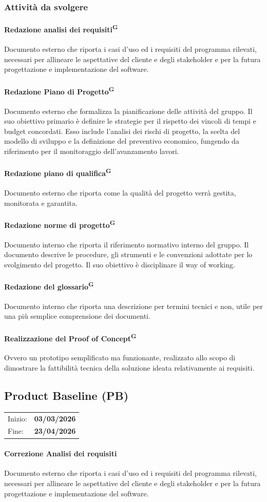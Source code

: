 \documentclass[a4paper, 11pt]{article}
\newcommand{\subsubsubsection}[1]{\paragraph{#1}}
\begin{document}
\subsubsection{Attività da svolgere}
\subsubsubsection{Redazione analisi dei requisiti\textsuperscript{G}}
Documento esterno che riporta i casi d'uso ed i requisiti del programma rilevati, necessari per allineare le aspettative del cliente e degli stakeholder e per la futura progettazione e implementazione del software.
\subsubsubsection{Redazione Piano di Progetto\textsuperscript{G}}
Documento esterno che formalizza la pianificazione delle attività del gruppo. Il suo obiettivo primario è definire le strategie per il rispetto dei vincoli di tempi e budget concordati.
Esso include l'analisi dei rischi di progetto, la scelta del modello di sviluppo e la definizione del preventivo economico, fungendo da riferimento per il monitoraggio dell'avanzamento lavori.
\subsubsubsection{Redazione piano di qualifica\textsuperscript{G}}
Documento esterno che riporta come la qualità del progetto verrà gestita, monitorata e garantita.
\subsubsubsection{Redazione norme di progetto\textsuperscript{G}}
Documento interno che riporta il riferimento normativo interno del gruppo. Il documento descrive le procedure, gli strumenti e le convenzioni adottate per lo svolgimento del progetto. Il suo obiettivo è disciplinare il way of working.
\subsubsubsection{Redazione del glossario\textsuperscript{G}}
Documento interno che riporta una descrizione per termini tecnici e non, utile per una più semplice comprensione dei documenti.
\subsubsubsection{Realizzazione del Proof of Concept\textsuperscript{G}}
Ovvero un prototipo semplificato ma funzionante, realizzato allo scopo di dimostrare la fattibilità tecnica della soluzione ideata relativamente ai requisiti.

\subsection{Product Baseline (PB)}
\vspace{0.4cm}
\begin{tabular}{ll}
Inizio: & \textbf{03/03/2026} \\
Fine: & \textbf{23/04/2026} \\
\end{tabular}
\vspace{0.2cm}

\subsubsubsection{Correzione Analisi dei requisiti}
Documento esterno che riporta i casi d'uso ed i requisiti del programma rilevati, necessari per allineare le aspettative del cliente e degli stakeholder e per la futura progettazione e implementazione del software.
\end{document}
